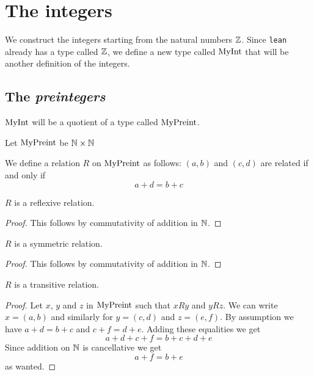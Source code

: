 \chapter{The integers}

We construct the integers starting from the natural numbers $\mathbb{Z}$. Since \texttt{lean} already has a
type called $\mathbb{Z}$, we define a new type called $\mathrm{MyInt}$ that will be another definition of the integers.

\section{The \emph{preintegers}}

$\mathrm{MyInt}$ will be a quotient of a type called $\mathrm{MyPreint}$.

\begin{definition}
    \label{MyPreint}
    \leanok
    Let $\mathrm{MyPreint}$ be $\mathbb{N} \times \mathbb{N}$
\end{definition}

\begin{definition}
    \label{MyPreint.R}
    \leanok
We define a relation $R$ on $\mathrm{MyPreint}$ as follows: $(a,b)$ and $(c, d)$ are related if and only if
\[
a + d = b + c
\]
\end{definition}

\begin{lemma}
$R$ is a reflexive relation.
    \label{MyPreint.R_refl}
    \leanok
\end{lemma}
\begin{proof}
    \leanok
    This follows by commutativity of addition in $\mathbb{N}$.
\end{proof}

\begin{lemma}
$R$ is a symmetric relation.
    \label{MyPreint.R_symm}
    \leanok
\end{lemma}
\begin{proof}
    \leanok
    This follows by commutativity of addition in $\mathbb{N}$.
\end{proof}

\begin{lemma}
$R$ is a transitive relation.
    \label{MyPreint.R_trans}
    \leanok
\end{lemma}
\begin{proof}
    \leanok
    Let $x$, $y$ and $z$ in $\mathrm{MyPreint}$ such that $x R y$ and $y R z$. We can write $x = (a,b)$ and similarly
    for $y = (c,d)$ and $z = (e,f)$. By assumption we have $a+d=b+c$ and $c+f=d+e$. Adding these equalities we get
    \[
    a+d+c+f=b+c+d+e
    \]
    Since addition on $\mathbb{N}$ is cancellative we get
    \[
    a+f = b + e
    \]
    as wanted.
\end{proof}

